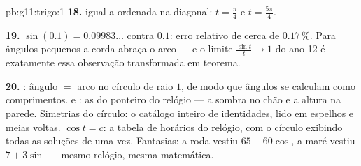 \begin{solution}{pb:g11:trigo:1}
\textbf{18.}  igual a ordenada na diagonal:
$t = \frac\pi4$ e $t = \frac{5\pi}{4}$.

\textbf{19.} $\sin(0.1) = 0.09983\ldots$ contra $0.1$: erro
relativo de cerca de $0.17\,\%$. Para ângulos pequenos a corda
abraça o arco --- e o limite $\frac{\sin t}{t} \to 1$ do ano 12
é exatamente essa observação transformada em teorema.

\textbf{20.} : ângulo $=$ arco no círculo de raio $1$,
de modo que ângulos se calculam como comprimentos.  e
: as  do ponteiro do relógio --- a sombra no
chão e a altura na parede. Simetrias do círculo: o catálogo
inteiro de identidades, lido em espelhos e meias voltas.
 $\cos t = c$: a tabela de horários do relógio, com o
círculo exibindo todas as soluções de uma vez. Fantasias: a
roda vestiu $65 - 60\cos$, a maré vestiu $7 + 3\sin$ --- mesmo
relógio, mesma matemática.
\end{solution}
